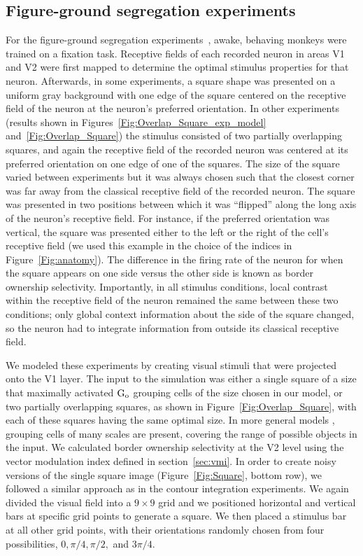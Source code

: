 \subsection{Figure-ground segregation experiments} 
\label{sec:FGO}

For the figure-ground segregation experiments~\citep{Zhou_etal00,
  Qiu_etal07, Zhang_vonderHeydt10}, awake, behaving monkeys were
trained on a fixation task.  Receptive fields of each recorded neuron
in areas V1 and V2 were first mapped to determine the optimal stimulus
properties for that neuron. Afterwards, in some experiments, a square
shape was presented on a uniform gray background with one edge of the
square centered on the receptive field of the neuron at the neuron's
preferred orientation.  In other experiments (results shown in
Figures~\ref{Fig:Overlap_Square_exp_model}
and~\ref{Fig:Overlap_Square}) the stimulus consisted of two partially
overlapping squares, and again the receptive field of the recorded
neuron was centered at its preferred orientation on one edge of one of
the squares.  The size of the square varied between experiments but it
was always chosen such that the closest corner was far away from the
classical receptive field of the recorded neuron. The square was
presented in two positions between which it was ``flipped'' along the
long axis of the neuron's receptive field. For instance, if the
preferred orientation was vertical, the square was presented either to
the left or the right of the cell's receptive field (we used this
example in the choice of the indices in Figure~\ref{Fig:anatomy}).
The difference in the firing rate of the neuron for when the square
appears on one side versus the other side is known as border ownership
selectivity. Importantly, in all stimulus conditions, local contrast
within the receptive field of the neuron remained the same between
these two conditions; only global context information about the side
of the square changed, so the neuron had to integrate information from
outside its classical receptive field.

We modeled these experiments by creating visual stimuli that were
projected onto the V1 layer. The input to the simulation was 
either a single square of a size that maximally activated $\rm G_o$ grouping cells of
the size chosen in our model, or two partially overlapping squares, as shown in
Figure~\ref{Fig:Overlap_Square}, with each of these squares having the same
optimal size. In more general models \citep{Craft_etal07,Mihalas_etal11b,Russell_etal14},
grouping cells of many scales are present, covering the range of possible objects in the
input. We calculated border ownership selectivity at the V2 level
using the vector modulation index defined in section~\ref{sec:vmi}.
In order to create noisy versions of the single square image
(Figure~\ref{Fig:Square}, bottom row), we followed a
similar approach as in the contour integration experiments.  We again
divided the visual field into a $9 \times 9$ grid and we positioned
horizontal and vertical bars at specific grid points to generate a
square. We then placed a stimulus bar at all other grid points, with
their orientations randomly chosen from four possibilities,
$0, \pi/4, \pi/2,$ and $3\pi/4$.

